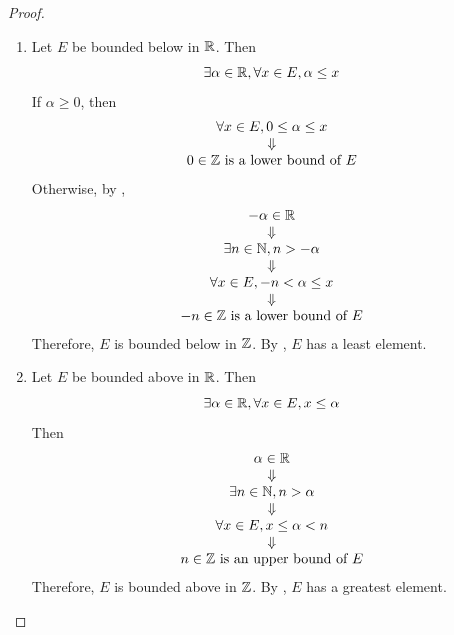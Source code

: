 \begin{proof}
    \begin{enumerate}[label=\textbf{(\Alph*)}]
        \item Let $E$ be bounded below in $\mathbb{R}$. Then
        \[
        \exists \alpha \in \mathbb{R}, \forall x \in E, \alpha \leq x
        \]
        If $\alpha \geq 0$, then
        \[
        \begin{array}{c}
            \forall x \in E, 0 \leq \alpha \leq x \\
            \Downarrow \\
            0 \in \mathbb{Z} \text{ is a lower bound of } E
        \end{array}
        \]
        Otherwise, by ,
        \[
        \begin{array}{c}
            - \alpha \in \mathbb{R} \\
            \Downarrow \\
            \exists n \in \mathbb{N}, n > - \alpha \\
            \Downarrow \\
            \forall x \in E, - n < \alpha \leq x \\
            \Downarrow \\
            -n \in \mathbb{Z} \text{ is a lower bound of } E
        \end{array}
        \]
        Therefore, $E$ is bounded below in $\mathbb{Z}$.
        By , $E$ has a least element.
        \item Let $E$ be bounded above in $\mathbb{R}$. Then
        \[
        \exists \alpha \in \mathbb{R}, \forall x \in E, x \leq \alpha
        \]
        Then
        \[
        \begin{array}{c}
            \alpha \in \mathbb{R} \\
            \Downarrow \\
            \exists n \in \mathbb{N}, n > \alpha \\
            \Downarrow \\
            \forall x \in E, x \leq \alpha < n \\
            \Downarrow \\
            n \in \mathbb{Z} \text{ is an upper bound of } E
        \end{array}
        \]
        Therefore, $E$ is bounded above in $\mathbb{Z}$.
        By , $E$ has a greatest element.
    \end{enumerate}
\end{proof}

